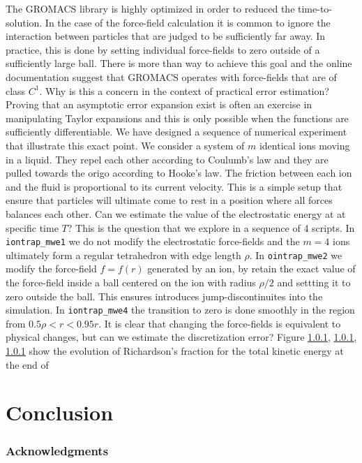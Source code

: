\documentclass[runningheads]{llncs}
\begin{document}
The GROMACS library is highly optimized in order to reduced the time-to-solution. In the case of the force-field calculation it is common to ignore the interaction between particles that are judged to be sufficiently far away. In practice, this is done by setting individual force-fields to zero outside of a sufficiently large ball. There is more than way to achieve this goal and the online documentation suggest that GROMACS operates with force-fields that are of class $C^1$. Why is this a concern in the context of practical error estimation? Proving that an asymptotic error expansion exist is often an exercise in manipulating Taylor expansions and this is only possible when the functions are sufficiently differentiable. We have designed a sequence of numerical experiment that illustrate this exact point. We consider a system of $m$ identical ions moving in a liquid. They repel each other according to Coulumb's law and they are pulled towards the origo according to Hooke's law. The friction between each ion and the fluid is proportional to its current velocity. This is a simple setup that ensure that particles will ultimate come to rest in a position where all forces balances each other. Can we estimate the value of the electrostatic energy at at specific time $T$? This is the question that we explore in a sequence of 4 scripts. In {\tt iontrap\_mwe1} we do not modify the electrostatic force-fields and the $m=4$ ions ultimately form a regular tetrahedron with edge length $\rho$. In {\tt ointrap\_mwe2} we modify the force-field $f = f(r)$ generated by an ion, by retain the exact value of the force-field inside a ball centered on the ion with radius $\rho/2$ and settting it to zero outside the ball. This ensures introduces jump-discontinuites into the simulation. In {\tt iontrap\_mwe4} the transition to zero is done smoothly in the region from $0.5 \rho < r < 0.95 r$. It is clear that changing the force-fields is equivalent to physical changes, but can we estimate the discretization error? Figure \ref{}, \ref{}, \ref{} show the evolution of Richardson's fraction for the total kinetic energy at the end of 

\section{Conclusion}



\subsubsection{Acknowledgments}
\end{document}
